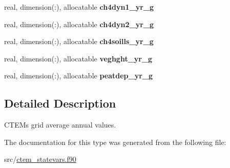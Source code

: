 \begin{DoxyCompactItemize}
\item 
\hypertarget{structctem__statevars_1_1ctem__gridavg__annual_acda9d81575d7385e3d1f98d505c7e12f}{}real, dimension(\+:), allocatable {\bfseries ch4dyn1\+\_\+yr\+\_\+g}\label{structctem__statevars_1_1ctem__gridavg__annual_acda9d81575d7385e3d1f98d505c7e12f}

\item 
\hypertarget{structctem__statevars_1_1ctem__gridavg__annual_aafc0d6073144f5ce8b9ef61b70d8ba91}{}real, dimension(\+:), allocatable {\bfseries ch4dyn2\+\_\+yr\+\_\+g}\label{structctem__statevars_1_1ctem__gridavg__annual_aafc0d6073144f5ce8b9ef61b70d8ba91}

\item 
\hypertarget{structctem__statevars_1_1ctem__gridavg__annual_a17178579f13f453f55c217a952ffc735}{}real, dimension(\+:), allocatable {\bfseries ch4soills\+\_\+yr\+\_\+g}\label{structctem__statevars_1_1ctem__gridavg__annual_a17178579f13f453f55c217a952ffc735}

\item 
\hypertarget{structctem__statevars_1_1ctem__gridavg__annual_ab9ab55898dcb154213b4914598b210b1}{}real, dimension(\+:), allocatable {\bfseries veghght\+\_\+yr\+\_\+g}\label{structctem__statevars_1_1ctem__gridavg__annual_ab9ab55898dcb154213b4914598b210b1}

\item 
\hypertarget{structctem__statevars_1_1ctem__gridavg__annual_af96245bc82b43b1a261016b8e7194219}{}real, dimension(\+:), allocatable {\bfseries peatdep\+\_\+yr\+\_\+g}\label{structctem__statevars_1_1ctem__gridavg__annual_af96245bc82b43b1a261016b8e7194219}

\end{DoxyCompactItemize}


\subsection{Detailed Description}
C\+T\+E\+M\textquotesingle{}s grid average annual values. 

The documentation for this type was generated from the following file\+:\begin{DoxyCompactItemize}
\item 
src/\hyperlink{ctem__statevars_8f90}{ctem\+\_\+statevars.\+f90}\end{DoxyCompactItemize}
